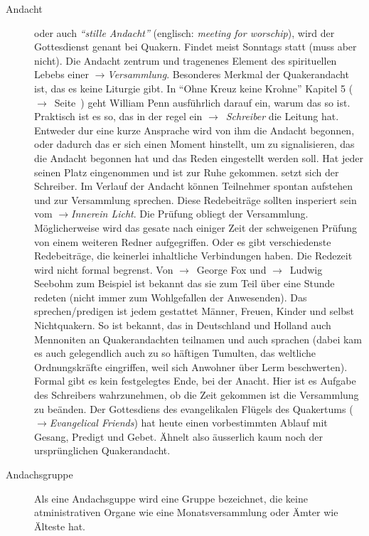\begin{description}
 \item[Andacht] oder auch \textit{"`stille Andacht"'} (englisch: \textit{meeting
for worschip}), wird der Gottesdienst genant bei Quakern. Findet meist Sonntags
statt (muss aber nicht). Die Andacht zentrum und tragenenes Element des
spirituellen Lebebs einer $\to$\textit{Versammlung}. Besonderes Merkmal der
Quakerandacht ist, das es keine Liturgie gibt. In "`Ohne Kreuz keine Krohne"'
Kapitel 5 ($\to$~Seite~\pageref{kap5_ab1}) geht William Penn ausführlich darauf
ein, warum das so ist. Praktisch ist es so, das in der regel ein
$\to$~\textit{Schreiber} die Leitung hat. Entweder dur eine kurze Ansprache wird
von ihm die Andacht begonnen, oder dadurch das er sich einen Moment hinstellt,
um zu signalisieren, das die Andacht begonnen hat und das Reden eingestellt
werden soll. Hat jeder seinen Platz eingenommen und ist zur Ruhe gekommen. setzt
sich der Schreiber. Im Verlauf der Andacht können Teilnehmer spontan aufstehen
und zur Versammlung sprechen. Diese Redebeiträge sollten insperiert sein vom
$\to$\textit{Innerein Licht}. Die Prüfung obliegt der Versammlung.
Möglicherweise wird das gesate nach einiger Zeit der schweigenen Prüfung von
einem weiteren Redner aufgegriffen. Oder es gibt verschiedenste Redebeiträge,
die keinerlei inhaltliche Verbindungen haben. Die Redezeit wird nicht formal
begrenst. Von $\to$~George Fox und $\to$~Ludwig Seebohm zum Beispiel ist bekannt
das sie zum Teil über eine Stunde redeten (nicht immer zum Wohlgefallen der
Anwesenden). Das sprechen/predigen ist jedem gestattet Männer, Freuen, Kinder
und selbst Nichtquakern. So ist bekannt, das in Deutschland und Holland auch
Mennoniten an Quakerandachten teilnamen und auch sprachen (dabei kam es auch
gelegendlich auch zu so häftigen Tumulten, das weltliche Ordnungskräfte
eingriffen, weil sich Anwohner über Lerm beschwerten). Formal gibt es kein
festgelegtes Ende, bei der Anacht. Hier ist es Aufgabe des Schreibers
wahrzunehmen, ob die Zeit gekommen ist die Versammlung zu beänden.  Der
Gottesdiens des evangelikalen Flügels des Quakertums ($\to$\textit{Evangelical
Friends}) hat heute einen vorbestimmten Ablauf mit Gesang, Predigt und Gebet.
Ähnelt also äusserlich kaum noch der ursprünglichen Quakerandacht.

 \item[Andachsgruppe] Als eine Andachsguppe wird eine Gruppe bezeichnet, die
 keine atministrativen Organe wie eine Monatsversammlung oder Ämter wie Älteste
 hat. 


\end{description}
